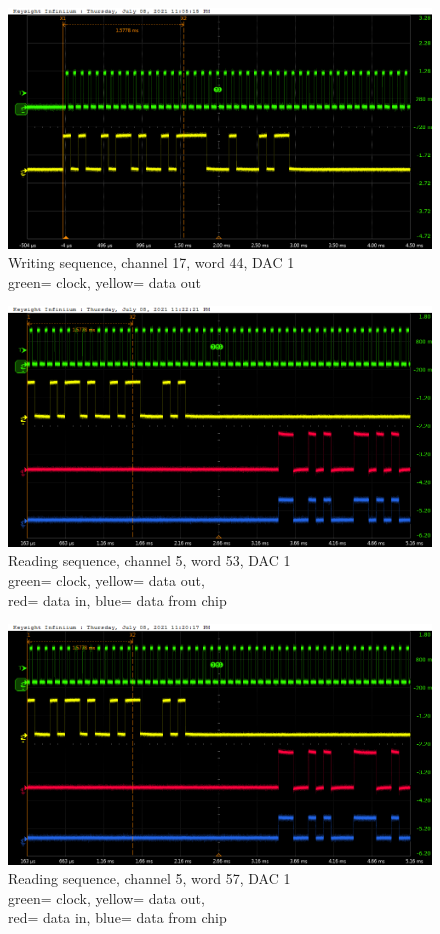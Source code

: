 \begin{figure}[H]
	\centering
	\includegraphics[width=0.6\linewidth]{IMG/ch5/probe/09-08-2021_ch17-write44-baselinedac1}
	\caption{Writing sequence, channel 17, word 44, DAC 1\\{\color{green}green}= clock, {\color{yellow}yellow}= data out}
	\label{fig:ch17write44}
\end{figure}

\begin{figure}[H]
	\centering
	\includegraphics[width=0.6\linewidth]{IMG/ch5/probe/09-08-2021_ch05-read53-baselinedac1}
	\caption{Reading sequence, channel 5, word 53, DAC 1\\{\color{green}green}= clock, {\color{yellow}yellow}= data out,\\{\color{red}red}= data in, {\color{blue}blue}= data from chip}
	\label{fig:ch05write53}
\end{figure}
\newpage
\thispagestyle{plain}
\begin{figure}[H]
	\centering
	\includegraphics[width=0.6\linewidth]{IMG/ch5/probe/09-08-2021_ch05-read57-baselinedac1}
	\caption{Reading sequence, channel 5, word 57, DAC 1\\{\color{green}green}= clock, {\color{yellow}yellow}= data out,\\{\color{red}red}= data in, {\color{blue}blue}= data from chip}
	\label{fig:ch05write57}
\end{figure}

